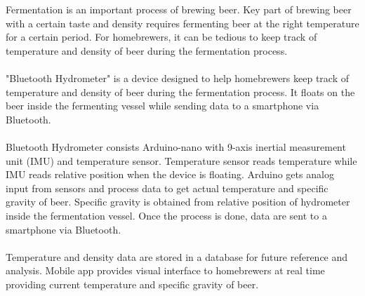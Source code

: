 Fermentation is an important process of brewing beer. Key part of brewing beer with a certain taste and density requires fermenting beer at the right temperature for a certain period. For homebrewers, it can be tedious to keep track of temperature and density of beer during the fermentation process.
\\\\
"Bluetooth Hydrometer" is a device designed to help homebrewers keep track of temperature and density of beer during the fermentation process. It floats on the beer inside the fermenting vessel while sending data to a smartphone via Bluetooth.
\\\\
Bluetooth Hydrometer consists Arduino-nano with 9-axis inertial measurement unit (IMU) and temperature sensor. Temperature sensor reads temperature while IMU reads relative position when the device is floating. Arduino gets analog input from sensors and process data to get actual temperature and specific gravity of beer. Specific gravity is obtained from relative position of hydrometer inside the fermentation vessel. Once the process is done, data are sent to a smartphone via Bluetooth.
\\\\
Temperature and density data are stored in a database for future reference and analysis. Mobile app provides visual interface to homebrewers at real time providing current temperature and specific gravity of beer.